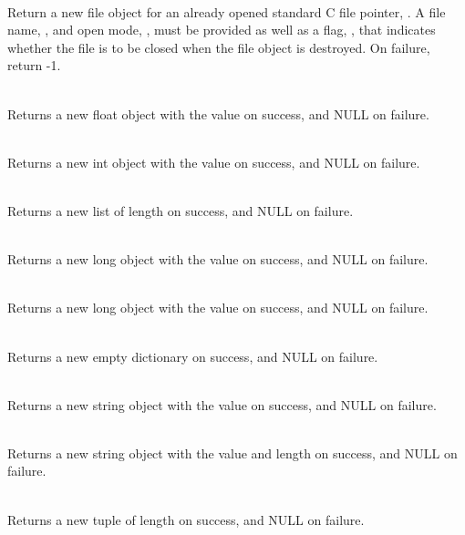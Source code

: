      \\
	 Return a new file object for an already opened standard C
	 file pointer, .  A file name, , and open mode,
	 , must be provided as well as a flag, , that
	 indicates whether the file is to be closed when the file
	 object is destroyed.  On failure, return -1.

     \\
	 Returns a new float object with the value  on success, and
	 NULL on failure.
     
     \\
	 Returns a new int object with the value  on success, and
	 NULL on failure.

     \\
	 Returns a new list of length  on success, and NULL on
	 failure.

     \\
	 Returns a new long object with the value  on success, and
	 NULL on failure.

     \\
	 Returns a new long object with the value  on success, and
	 NULL on failure.

     \\
	 Returns a new empty dictionary on success, and NULL on
	 failure.

     \\
	 Returns a new string object with the value  on success, and
	 NULL on failure.

     \\
	 Returns a new string object with the value  and length 
	 on success, and NULL on failure.

     \\
	 Returns a new tuple of length  on success, and NULL on
	 failure.

